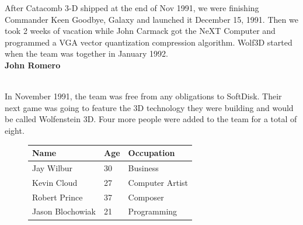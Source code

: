 \documentclass[book.tex]{subfiles}
\begin{document}
\par
\begin{fancyquotes}
After Catacomb 3-D shipped at the end of Nov 1991, we were finishing Commander Keen Goodbye, Galaxy and launched it December 15, 1991. Then we took 2 weeks of vacation while John Carmack got the NeXT Computer and programmed a VGA vector quantization compression algorithm. Wolf3D started when the team was together in January 1992.
 \bigskip \\
\textbf{John Romero}
 \end{fancyquotes}\\

In November 1991, the team was free from any obligations to SoftDisk. Their next game was going to feature the 3D technology they were building and would be called Wolfenstein 3D. Four more people were added to the team for a total of eight.
 \begin{figure}[H]

\centering  
\begin{tabularx}{\textwidth}{ X  X  X  }
  \toprule
  \textbf{Name} &  \textbf{Age} & \textbf{Occupation} \\
  \toprule 
   Jay Wilbur & 30 &  Business\\
   Kevin Cloud\protect\footnotemark & 27 &  Computer Artist\\
   Robert Prince\protect\footnotemark & 37 &  Composer\\
   Jason Blochowiak\protect\footnotemark & 21 &   Programming\\
     \toprule
\end{tabularx}
\label{fig:Id Software hires}
\end{figure}
\addtocounter{footnote}{-2}

\end{document}
